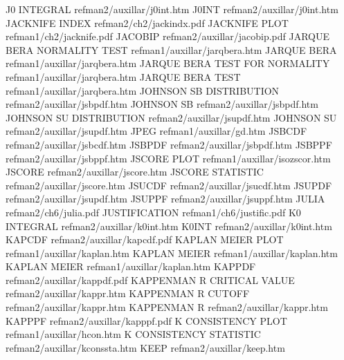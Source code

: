 J0 INTEGRAL                             refman2/auxillar/j0int.htm
J0INT                                   refman2/auxillar/j0int.htm
JACKNIFE INDEX                          refman2/ch2/jackindx.pdf
JACKNIFE PLOT                           refman1/ch2/jacknife.pdf
JACOBIP                                 refman2/auxillar/jacobip.pdf
JARQUE BERA NORMALITY TEST              refman1/auxillar/jarqbera.htm
JARQUE BERA                             refman1/auxillar/jarqbera.htm
JARQUE BERA TEST FOR NORMALITY          refman1/auxillar/jarqbera.htm
JARQUE BERA TEST                        refman1/auxillar/jarqbera.htm
JOHNSON SB DISTRIBUTION                 refman2/auxillar/jsbpdf.htm
JOHNSON SB                              refman2/auxillar/jsbpdf.htm
JOHNSON SU DISTRIBUTION                 refman2/auxillar/jsupdf.htm
JOHNSON SU                              refman2/auxillar/jsupdf.htm
JPEG                                    refman1/auxillar/gd.htm
JSBCDF                                  refman2/auxillar/jsbcdf.htm
JSBPDF                                  refman2/auxillar/jsbpdf.htm
JSBPPF                                  refman2/auxillar/jsbppf.htm
JSCORE PLOT                             refman1/auxillar/isozscor.htm
JSCORE                                  refman2/auxillar/jscore.htm
JSCORE STATISTIC                        refman2/auxillar/jscore.htm
JSUCDF                                  refman2/auxillar/jsucdf.htm
JSUPDF                                  refman2/auxillar/jsupdf.htm
JSUPPF                                  refman2/auxillar/jsuppf.htm
JULIA                                   refman2/ch6/julia.pdf
JUSTIFICATION                           refman1/ch6/justific.pdf
K0 INTEGRAL                             refman2/auxillar/k0int.htm
K0INT                                   refman2/auxillar/k0int.htm
KAPCDF                                  refman2/auxillar/kapcdf.pdf
KAPLAN MEIER PLOT                       refman1/auxillar/kaplan.htm
KAPLAN MEIER                            refman1/auxillar/kaplan.htm
KAPLAN MEIER                            refman1/auxillar/kaplan.htm
KAPPDF                                  refman2/auxillar/kappdf.pdf
KAPPENMAN R CRITICAL VALUE              refman2/auxillar/kappr.htm
KAPPENMAN R CUTOFF                      refman2/auxillar/kappr.htm
KAPPENMAN R                             refman2/auxillar/kappr.htm
KAPPPF                                  refman2/auxillar/kapppf.pdf
K CONSISTENCY PLOT                      refman1/auxillar/hcon.htm
K CONSISTENCY STATISTIC                 refman2/auxillar/kconssta.htm
KEEP                                    refman2/auxillar/keep.htm
